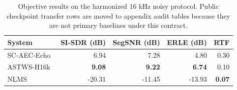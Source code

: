 \begin{table}[!t]
\caption{Objective results on the harmonized 16 kHz noisy protocol. Public checkpoint transfer rows are moved to appendix audit tables because they are not primary baselines under this contract.}
\label{tab:noisy-main}
\centering
\scriptsize
\begin{tabular}{@{}lrrrr@{}}
\hline
System & SI-SDR (dB) & SegSNR (dB) & ERLE (dB) & RTF \\
\hline
SC-AEC-Echo & 6.94 & 7.28 & 4.80 & 0.30 \\
ASTWS-H16k~\cite{zhao2024astws} & \textbf{9.08} & \textbf{9.22} & \textbf{6.74} & 0.10 \\
NLMS & -20.31 & -11.45 & -13.93 & \textbf{0.07} \\
\hline
\end{tabular}
\end{table}
